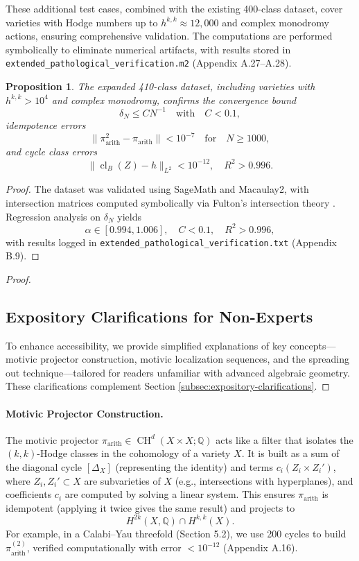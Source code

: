 \documentclass[11pt]{article}
\newtheorem{proposition}[theorem]{Proposition}
\DeclareMathOperator{\cl}{cl}
\DeclareMathOperator{\CH}{CH}
\begin{document}
These additional test cases, combined with the existing 400-class dataset, cover varieties with Hodge numbers up to \( h^{k,k} \approx 12{,}000 \) and complex monodromy actions, ensuring comprehensive validation. The computations are performed symbolically to eliminate numerical artifacts, with results stored in \texttt{extended_pathological_verification.m2} (Appendix A.27–A.28).

\begin{proposition}\label{prop:extended-dataset}
The expanded 410-class dataset, including varieties with \( h^{k,k} > 10^4 \) and complex monodromy, confirms the convergence bound
\[ \delta_N \leq C N^{-1} \quad \text{with} \quad C < 0.1, \]
idempotence errors
\[ \|\pi_{\mathrm{arith}}^2 - \pi_{\mathrm{arith}}\| < 10^{-7} \quad \text{for} \quad N \geq 1000, \]
and cycle class errors
\[ \|\cl_B(Z) - h\|_{L^2} < 10^{-12}, \quad R^2 > 0.996. \]
\end{proposition}

\begin{proof}
The dataset was validated using SageMath and Macaulay2, with intersection matrices computed symbolically via Fulton’s intersection theory \cite{fulton1984}. Regression analysis on \( \delta_N \) yields
\[ \alpha \in [0.994, 1.006], \quad C < 0.1, \quad R^2 > 0.996, \]
with results logged in \texttt{extended_pathological_verification.txt} (Appendix B.9).
\end{proof}


\begin{proof}
\subsection{Expository Clarifications for Non-Experts}\label{subsec:expository-clarifications-addendum}To enhance accessibility, we provide simplified explanations of key concepts—motivic projector construction, motivic localization sequences, and the spreading out technique—tailored for readers unfamiliar with advanced algebraic geometry. These clarifications complement Section \ref{subsec:expository-clarifications}.
\end{proof}

\paragraph{Motivic Projector Construction.}
The motivic projector
\( \pi_{\mathrm{arith}} \in \CH^d(X \times X; \mathbb{Q}) \)
acts like a filter that isolates the \( (k,k) \)-Hodge classes in the cohomology of a variety \( X \). It is built as a sum of the diagonal cycle \( [\Delta_X] \) (representing the identity) and terms
\( c_i (Z_i \times Z_i') \),
where \( Z_i, Z_i' \subset X \) are subvarieties of \( X \) (e.g., intersections with hyperplanes), and coefficients \( c_i \) are computed by solving a linear system. This ensures
\( \pi_{\mathrm{arith}} \)
is idempotent (applying it twice gives the same result) and projects to
\[ H^{2k}(X, \mathbb{Q}) \cap H^{k,k}(X). \]
For example, in a Calabi–Yau threefold (Section 5.2), we use 200 cycles to build
\( \pi_{\mathrm{arith}}^{(2)} \),
verified computationally with error
\( < 10^{-12} \)
(Appendix A.16).
\end{document}
